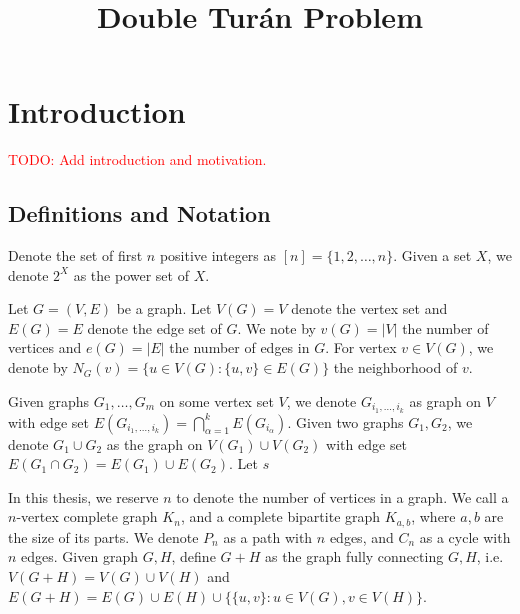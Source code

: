 \documentclass[12pt]{report}
\title{Double Turán Problem}
\begin{document}
\maketitle



\tableofcontents

\chapter{Introduction}

\textcolor{red}{TODO: Add introduction and motivation.}

\section{Definitions and Notation}

Denote the set of first $n$ positive integers as $[n] = \{1, 2, \ldots, n\}$. Given a set $X$, we denote $2^X$ as the power set of $X$.

Let $G = (V, E)$ be a graph. Let $V(G) = V$ denote the vertex set and $E(G) = E$ denote the edge set of $G$. We note by $v(G) = |V|$ the number of vertices and $e(G) = |E|$ the number of edges in $G$. For vertex $v \in V(G)$, we denote by $N_G(v) = \{u \in V(G) : \{u, v\} \in E(G)\}$ the neighborhood of $v$.

Given graphs $G_1, \ldots, G_m$ on some vertex set $V$, we denote $G_{i_1, \ldots, i_k}$ as graph on $V$ with edge set $E(G_{i_1, \ldots, i_k}) = \bigcap_{\alpha = 1}^k E(G_{i_\alpha})$. Given two graphs $G_1, G_2$, we denote $G_1 \cup G_2$ as the graph on $V(G_1) \cup V(G_2)$ with edge set $E(G_1 \cap G_2) = E(G_1) \cup E(G_2)$. Let $s$

In this thesis, we reserve $n$ to denote the number of vertices in a graph. We call a $n$-vertex complete graph $K_n$, and a complete bipartite graph $K_{a, b}$, where $a, b$ are the size of its parts. We denote $P_n$ as a path with $n$ edges, and $C_n$ as a cycle with $n$ edges. Given graph $G, H$, define $G + H$ as the graph fully connecting $G, H$, i.e. $V(G + H) = V(G) \cup V(H)$ and $E(G + H) = E(G) \cup E(H) \cup \{\{u, v\} : u \in V(G), v \in V(H)\}$.
\end{document}

